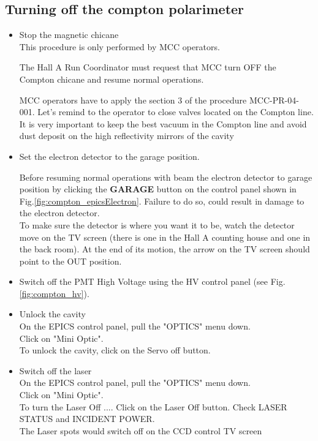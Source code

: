 \subsection{Turning off the compton polarimeter}
\begin{itemize} 
\item  Stop the magnetic chicane\\

        This procedure is only performed by MCC operators.
    
        
        The Hall A Run Coordinator must request that
        MCC turn OFF the Compton chicane and resume normal operations.
    
        MCC operators have to apply the section 3 of 
        the procedure MCC-PR-04-001\cite{compton_beam_tune}. Let's remind to the operator
       to close valves located on the Compton line. It is very important
       to keep the best vacuum in the Compton line and avoid
       dust deposit on the high reflectivity mirrors of the cavity
       
\item Set the electron detector to the garage position.

Before resuming normal operations with beam the electron detector to garage position by clicking 
the  {\bf GARAGE} button on the control panel shown in Fig.\ref{fig:compton_epicsElectron}. Failure to do so, could result in damage to the electron detector. \\


To make sure the detector is where you want it to be, watch the detector move on the TV screen (there is one in the Hall A counting house and one in the back room). At the end of its motion, the arrow on the TV screen should point to the OUT position.

\item  Switch off the PMT High Voltage using the HV  control panel (see Fig.\ref{fig:compton_hv}).

\item Unlock the cavity\\
On the EPICS control panel, pull the "OPTICS" menu down. \\
Click on "Mini Optic".\\
To unlock the cavity, click on the Servo off button.\\
\item Switch off the laser\\
On the EPICS control panel, pull the "OPTICS" menu down.\\
 Click on "Mini Optic".\\
 To turn the Laser Off .... Click on the Laser Off button.
 Check LASER STATUS and INCIDENT POWER.\\
 The Laser spots would switch off on the CCD control TV screen
\end {itemize}

